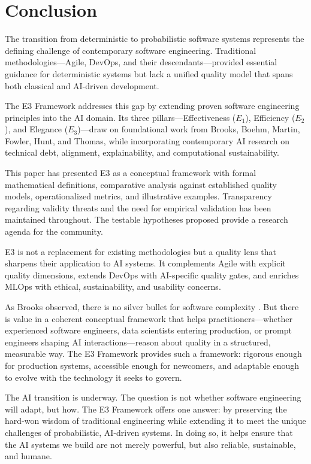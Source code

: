 \documentclass[11pt,a4paper]{article}
\begin{document}
\section{Conclusion}

The transition from deterministic to probabilistic software systems represents the defining challenge of contemporary software engineering. Traditional methodologies---Agile, DevOps, and their descendants---provided essential guidance for deterministic systems but lack a unified quality model that spans both classical and AI-driven development.

The E3 Framework addresses this gap by extending proven software engineering principles into the AI domain. Its three pillars---Effectiveness ($E_1$), Efficiency ($E_2$), and Elegance ($E_3$)---draw on foundational work from Brooks, Boehm, Martin, Fowler, Hunt, and Thomas, while incorporating contemporary AI research on technical debt, alignment, explainability, and computational sustainability.

This paper has presented E3 as a conceptual framework with formal mathematical definitions, comparative analysis against established quality models, operationalized metrics, and illustrative examples. Transparency regarding validity threats and the need for empirical validation has been maintained throughout. The testable hypotheses proposed provide a research agenda for the community.

E3 is not a replacement for existing methodologies but a quality lens that sharpens their application to AI systems. It complements Agile with explicit quality dimensions, extends DevOps with AI-specific quality gates, and enriches MLOps with ethical, sustainability, and usability concerns.

As Brooks observed, there is no silver bullet for software complexity \cite{brooks1975mythical}. But there is value in a coherent conceptual framework that helps practitioners---whether experienced software engineers, data scientists entering production, or prompt engineers shaping AI interactions---reason about quality in a structured, measurable way. The E3 Framework provides such a framework: rigorous enough for production systems, accessible enough for newcomers, and adaptable enough to evolve with the technology it seeks to govern.

The AI transition is underway. The question is not whether software engineering will adapt, but how. The E3 Framework offers one answer: by preserving the hard-won wisdom of traditional engineering while extending it to meet the unique challenges of probabilistic, AI-driven systems. In doing so, it helps ensure that the AI systems we build are not merely powerful, but also reliable, sustainable, and humane.



\end{document}
